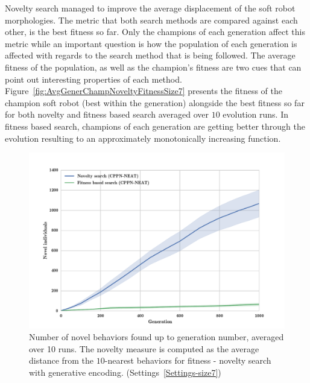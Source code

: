 Novelty search managed to improve the average displacement of the soft robot morphologies. The metric that both search methods are compared against each other, is the best fitness so far. Only the champions of each generation affect this metric while an important question is how the population of each generation is affected with regards to the search method that is being followed. The average fitness of the population, as well as the champion's fitness are two cues that can point out interesting properties of each method. Figure~\ref{fig:AvgGenerChampNoveltyFitnessSize7} presents the fitness of the champion soft robot (best within the generation) alongside the best fitness so far for both novelty and fitness based search averaged over $10$ evolution runs. In fitness based search, champions of each generation are getting better through the evolution resulting to an approximately monotonically increasing function. 
\begin{figure}[t!]
\centering
\includegraphics[width=1.0\textwidth]{../Figures/Results/novelIndividualsFitNovComp.pdf}
\caption{Number of novel behaviors found up to generation number, averaged over 10 runs. The novelty measure is computed as the average distance from the $10$-nearest behaviors for fitness - novelty search with generative encoding. (Settings~\ref{Settings-size7})}
\label{fig:novelIndividualsFitNovComp}
\end{figure}
